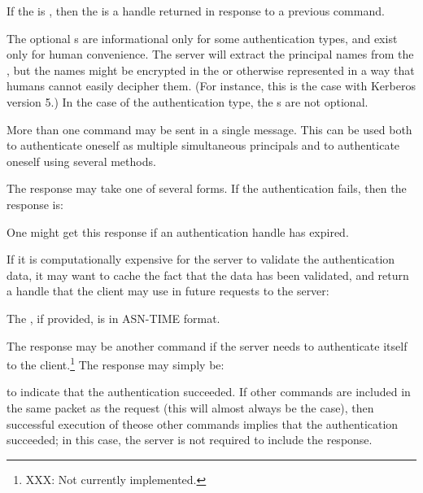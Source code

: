 If the  is , then the
 is a handle returned in response to a
previous  command.  

The optional s are informational only for some
authentication types, and exist only for human convenience.  The
server will extract the principal names from the
, but the names might be encrypted in the
 or otherwise represented in a way that
humans cannot easily decipher them.  (For instance, this is the case
with Kerberos version 5.)  In the case of the 
authentication type, the s are not optional.

More than one  command may be sent in a single
message.  This can be used both to authenticate oneself as multiple
simultaneous principals and to authenticate oneself using several methods.

The response may take one of several forms.  If the authentication
fails, then the response is:
\begin{command}
  \zoos{}\zooe
\end{command}
One might get this response if an authentication handle has expired.

If it is computationally expensive for the server to validate the
authentication data, it may want to cache the fact that the data has
been validated, and return a handle that the client may use in future
requests to the server:
\begin{command}
 \zoos{} 
 \zoos{}\zooe \zooe
\end{command}
The , if provided, is in ASN-TIME format.

The response may be another  command if the server
needs to authenticate itself to the client.\footnote{XXX: Not
currently implemented.}  The response may simply be:
\begin{command}
\end{command}
to indicate that the authentication succeeded.  If other commands are
included in the same packet as the  request (this
will almost always be the case), then successful execution of theose
other commands implies that the authentication succeeded; in this case,
the server is not required to include the  response.

